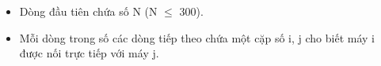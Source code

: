 \begin{itemize}
	\item     Dòng đầu tiên chứa số N (N $\le$ 300).   
	\item     Mỗi dòng trong số các dòng tiếp theo chứa một cặp số i, j cho biết máy i được nối trực tiếp với máy j.   
\end{itemize}

\